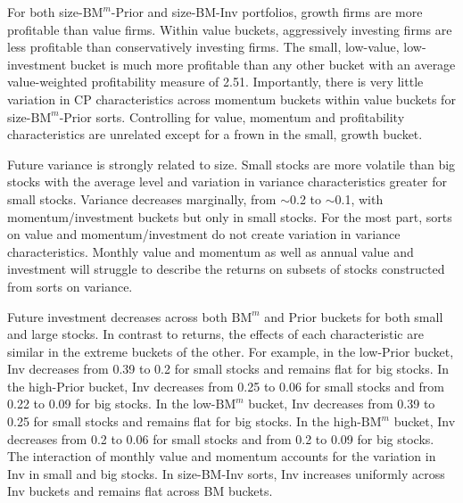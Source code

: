For both size-$\text{BM}^m$-Prior and size-BM-Inv portfolios,
growth firms are more profitable than value firms.
Within value buckets, aggressively investing firms are less profitable than
conservatively investing firms.
The small, low-value, low-investment bucket is much more profitable than any
other bucket with an average value-weighted profitability measure of 2.51.
Importantly, there is very little variation in CP characteristics across
momentum buckets within value buckets for size-$\text{BM}^m$-Prior sorts.
Controlling for value, momentum and profitability characteristics are unrelated
except for a frown in the small, growth bucket.

Future variance is strongly related to size. Small stocks are more volatile
than big stocks with the average level and variation in variance
characteristics greater for small stocks. Variance decreases marginally, from
$\sim$0.2 to $\sim$0.1, with momentum/investment buckets but only in small
stocks. For the most part, sorts on value and momentum/investment do not create
variation in variance characteristics. Monthly value and momentum as well as
annual value and investment will struggle to describe the returns on subsets of
stocks constructed from sorts on variance.

Future investment decreases across both $\text{BM}^m$ and Prior buckets for
both small and large stocks. In contrast to returns, the effects of each
characteristic are similar in the extreme buckets of the other. For example, in
the low-Prior bucket, Inv decreases from 0.39 to 0.2 for small stocks and
remains flat for big stocks. In the high-Prior bucket, Inv decreases from 0.25
to 0.06 for small stocks and from 0.22 to 0.09 for big stocks. In the
low-$\text{BM}^m$ bucket, Inv decreases from 0.39 to 0.25 for small stocks and
remains flat for big stocks. In the high-$\text{BM}^m$ bucket, Inv decreases
from 0.2 to 0.06 for small stocks and from 0.2 to 0.09 for big stocks. The
interaction of monthly value and momentum accounts for the variation in Inv in
small and big stocks. In size-BM-Inv sorts, Inv increases uniformly across Inv
buckets and remains flat across BM buckets.

